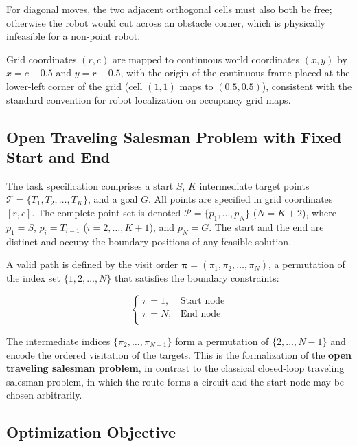 \documentclass[pdflatex,sn-basic,Numbered]{sn-jnl}
\begin{document}
For diagonal moves, the two adjacent orthogonal cells must also both be free; otherwise the robot would cut across an obstacle corner, which is physically infeasible for a non-point robot.

Grid coordinates $(r, c)$ are mapped to continuous world coordinates $(x, y)$ by $x = c - 0.5$ and $y = r - 0.5$, with the origin of the continuous frame placed at the lower-left corner of the grid (cell $(1,1)$ maps to $(0.5, 0.5)$), consistent with the standard convention for robot localization on occupancy grid maps.

\subsection{Open Traveling Salesman Problem with Fixed Start and End}
\label{subsec:otspp}

The task specification comprises a start $S$, $K$ intermediate target points $\mathcal{T} = \{T_1, T_2, \dots, T_K\}$, and a goal $G$. All points are specified in grid coordinates $[r, c]$. The complete point set is denoted $\mathcal{P} = \{p_1, \dots, p_N\}$ ($N = K + 2$), where $p_1 = S$, $p_i = T_{i-1}$ ($i = 2, \dots, K+1$), and $p_N = G$. The start and the end are distinct and occupy the boundary positions of any feasible solution.

A valid path is defined by the visit order $\bm{\pi} = (\pi_1, \pi_2, \dots, \pi_N)$, a permutation of the index set $\{1, 2, \dots, N\}$ that satisfies the boundary constraints:

\begin{equation}
\begin{cases}
\pi = 1, & \text{Start node} \\
\pi = N, & \text{End node} \\
\end{cases}
\label{eq:boundary}
\end{equation}

The intermediate indices $\{\pi_2, \dots, \pi_{N-1}\}$ form a permutation of $\{2, \dots, N-1\}$ and encode the ordered visitation of the targets. This is the formalization of the \textbf{open traveling salesman problem}, in contrast to the classical closed-loop traveling salesman problem, in which the route forms a circuit and the start node may be chosen arbitrarily\cite{ref4,ref36}.

\subsection{Optimization Objective}
\end{document}
